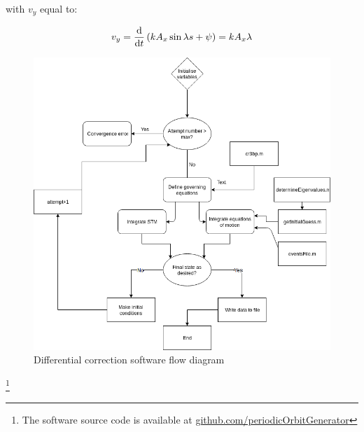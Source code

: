 \noindent with $v_y$ equal to:

\begin{equation}
	v_y = \frac{\textnormal{d}}{\textnormal{d}t} \left(kA_x\sin{\lambda s + \psi}\right) = kA_x\lambda
\end{equation}


\begin{figure}
\centering
\includegraphics[height=.4\textheight]{figures/differentialCorrectorFlow}
\caption{Differential correction software flow diagram}
\label{f:differentialcorrectorflow}
\end{figure}

 \footnote{The software source code is available at \url{github.com/periodicOrbitGenerator}}

